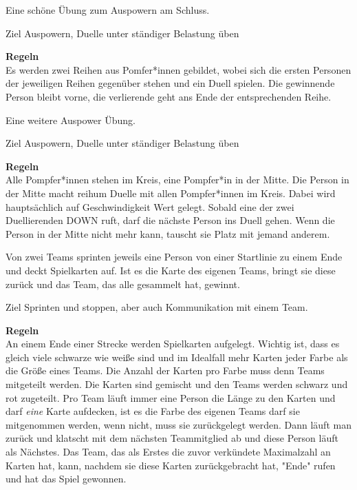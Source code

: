 
Eine schöne Übung zum Auspowern am Schluss. 

\begin{bclogo}[logo=\bcoutil]{Ziel}
Auspowern, Duelle unter ständiger Belastung üben
\end{bclogo}

\textbf{\large Regeln}\\
Es werden zwei Reihen aus Pomfer*innen gebildet, wobei sich die ersten Personen der jeweiligen Reihen gegenüber stehen und ein Duell spielen. Die gewinnende Person bleibt vorne, die verlierende geht ans Ende der entsprechenden Reihe. 


Eine weitere Auspower Übung. 

\begin{bclogo}[logo=\bcoutil]{Ziel}
Auspowern, Duelle unter ständiger Belastung üben
\end{bclogo}

\textbf{\large Regeln}\\
Alle Pompfer*innen stehen im Kreis, eine Pompfer*in in der Mitte. Die Person in der Mitte macht reihum Duelle mit allen Pompfer*innen im Kreis. Dabei wird hauptsächlich auf Geschwindigkeit Wert gelegt. Sobald eine der zwei Duellierenden DOWN ruft, darf die nächste Person ins Duell gehen.
Wenn die Person in der Mitte nicht mehr kann, tauscht sie Platz mit jemand anderem.


Von zwei Teams sprinten jeweils eine Person von einer Startlinie zu einem Ende und deckt Spielkarten auf. Ist es die Karte des eigenen Teams, bringt sie diese zurück und das Team, das alle gesammelt hat, gewinnt.

\begin{bclogo}[logo=\bcoutil]{Ziel}
Sprinten und stoppen, aber auch Kommunikation mit einem Team.
\end{bclogo}

\textbf{\large Regeln}\\
An einem Ende einer Strecke werden Spielkarten aufgelegt. Wichtig ist, dass es gleich viele schwarze wie weiße sind und im Idealfall mehr Karten jeder Farbe als die Größe eines Teams. Die Anzahl der Karten pro Farbe muss denn Teams mitgeteilt werden. Die Karten sind gemischt und den Teams werden schwarz und rot zugeteilt. Pro Team läuft immer eine Person die Länge zu den Karten und darf \emph{eine} Karte aufdecken, ist es die Farbe des eigenen Teams darf sie mitgenommen werden, wenn nicht, muss sie zurückgelegt werden. Dann läuft man zurück und klatscht mit dem nächsten Teammitglied ab und diese Person läuft als Nächstes. Das Team, das als Erstes die zuvor verkündete Maximalzahl an Karten hat, kann, nachdem sie diese Karten zurückgebracht hat, "Ende" rufen und hat das Spiel gewonnen.


